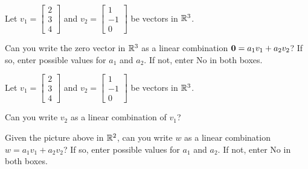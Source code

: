

\edXsolution{ 
}


\endedxproblem



Let $v_1 = \left[\begin{array}{c} 2 \\ 3  \\ 4 \end{array} \right]$ and  
$v_2 = \left[\begin{array}{c} 1 \\ -1  \\ 0 \end{array} \right] $  be vectors in $\mathbb R^3$.

Can you write the zero vector in $\mathbb R^3$
as a linear combination $\mathbf{0} = a_1 v_1 + a_2 v_2$?  If so, enter possible values for $a_1$ and
$a_2$.  If not, enter No in both boxes.  



\edXsolution{ 
}


\endedxproblem




Let $v_1 = \left[\begin{array}{c} 2 \\ 3  \\ 4 \end{array} \right]$ and  
$v_2 = \left[\begin{array}{c} 1 \\ -1  \\ 0 \end{array} \right]$  be vectors in $\mathbb R^3$.

Can you write $v_2$
as a linear combination of $v_1$?   



\edXsolution{ 
}


\endedxproblem



\begin{center}
   
\end{center}

Given the picture above in $\mathbb R^2$, 
can you write $w$ as a linear combination $w = a_1 v_1 + a_2 v_2$?  If so, enter possible values for $a_1$ and
$a_2$.  If not, enter No in both boxes.  


